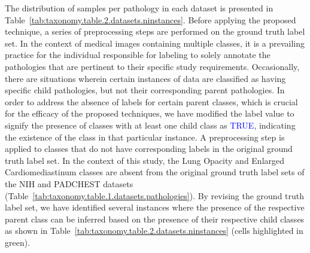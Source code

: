 \documentclass[review,1p,times,numbers]{elsarticle}
\begin{document}
The distribution of samples per pathology in each dataset is presented in Table~\ref{tab:taxonomy.table.2.datasets.ninstances}. Before applying the proposed technique, a series of preprocessing steps are performed on the ground truth label set. In the context of medical images containing multiple classes, it is a prevailing practice for the individual responsible for labeling to solely annotate the pathologies that are pertinent to their specific study requirements. Occasionally, there are situations wherein certain instances of data are classified as having specific child pathologies, but not their corresponding parent pathologies. In order to address the absence of labels for certain parent classes, which is crucial for the efficacy of the proposed techniques, we have modified the label value to signify the presence of classes with at least one child class as \textcolor{blue}{TRUE}, indicating the existence of the class in that particular instance. A preprocessing step is applied to classes that do not have corresponding labels in the original ground truth label set. In the context of this study, the Lung Opacity and Enlarged Cardiomediastinum classes are absent from the original ground truth label sets of the NIH and PADCHEST datasets (Table~\ref{tab:taxonomy.table.1.datasets.pathologies}). By revising the ground truth label set, we have identified several instances where the presence of the respective parent class can be inferred based on the presence of their respective child classes as shown in Table~\ref{tab:taxonomy.table.2.datasets.ninstances} (cells highlighted in green).
\end{document}
